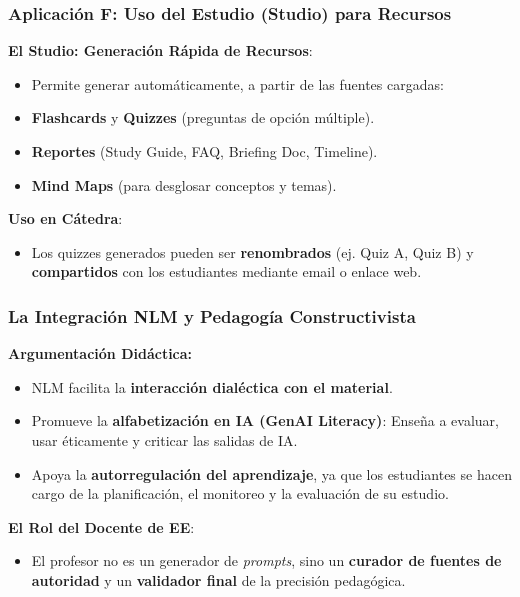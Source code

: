 \documentclass[aspectratio=43]{beamer}
\begin{document}
\begin{frame}
\frametitle{ Aplicación F: Uso del Estudio (Studio) para Recursos}

\textbf{El Studio: Generación Rápida de Recursos}:
\begin{itemize}
    \item Permite generar automáticamente, a partir de las fuentes cargadas:
    \item \textbf{Flashcards} y \textbf{Quizzes} (preguntas de opción múltiple).
    \item \textbf{Reportes} (Study Guide, FAQ, Briefing Doc, Timeline).
    \item \textbf{Mind Maps} (para desglosar conceptos y temas).
\end{itemize}

\vfill
\textbf{Uso en Cátedra}:
\begin{itemize}
    \item Los quizzes generados pueden ser \textbf{renombrados} (ej. Quiz A, Quiz B) y \textbf{compartidos} con los estudiantes mediante email o enlace web.
\end{itemize}
\end{frame}


\begin{frame}
\frametitle{ La Integración NLM y Pedagogía Constructivista}

\textbf{Argumentación Didáctica:}
\begin{itemize}
    \item NLM facilita la \textbf{interacción dialéctica con el material}.
    \item Promueve la \textbf{alfabetización en IA (GenAI Literacy)}: Enseña a evaluar, usar éticamente y criticar las salidas de IA.
    \item Apoya la \textbf{autorregulación del aprendizaje}, ya que los estudiantes se hacen cargo de la planificación, el monitoreo y la evaluación de su estudio.
\end{itemize}
\vfill
\textbf{El Rol del Docente de EE}:
\begin{itemize}
    \item El profesor no es un generador de \textit{prompts}, sino un \textbf{curador de fuentes de autoridad} y un \textbf{validador final} de la precisión pedagógica.
\end{itemize}
\end{frame}
\end{document}
